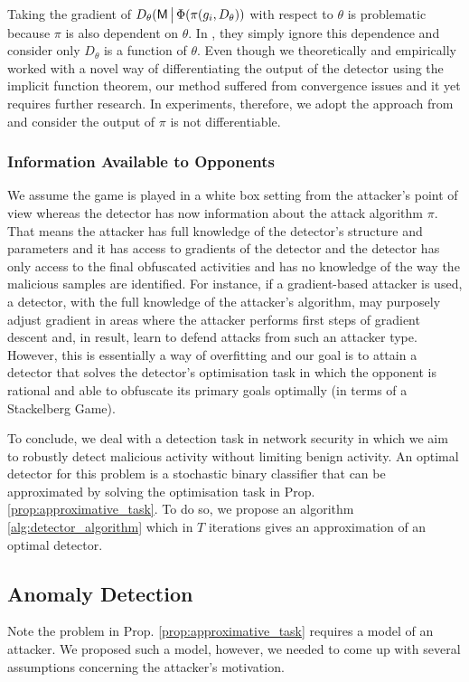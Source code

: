 Taking the gradient of $D_\theta(\mathsf{M} \,\big|\, \Phi( \pi (g_i, D_\theta) )$ with respect to $\theta$ is problematic because $\pi$ is also dependent on $\theta$. In \cite{exploitability_descent}, they simply ignore this dependence and consider only $D_\theta$ is a function of $\theta$.
Even though we theoretically and empirically worked with a novel way of differentiating the output of the detector using the implicit function theorem, our method suffered from convergence issues and it yet requires further research. In experiments, therefore, we adopt the approach from \cite{exploitability_descent} and consider the output of $\pi$ is not differentiable.

\subsubsection{Information Available to Opponents}
We assume the game is played in a white box setting from the attacker's point of view whereas the detector has now information about the attack algorithm $\pi$. That means the attacker has full knowledge of the detector's structure and parameters and it has access to gradients of the detector and the detector has only access to the final obfuscated activities and has no knowledge of the way the malicious samples are identified. For instance, if a gradient-based attacker is used, a detector, with the full knowledge of the attacker's algorithm, may purposely adjust gradient in areas where the attacker performs first steps of gradient descent and, in result, learn to defend attacks from such an attacker type. However, this is essentially a way of overfitting and our goal is to attain a detector that solves the detector's optimisation task in which the opponent is rational and able to obfuscate its primary goals optimally (in terms of a Stackelberg Game).

To conclude, we deal with a detection task in network security in which we aim to robustly detect malicious activity without limiting benign activity. An optimal detector for this problem is a stochastic binary classifier that can be approximated by solving the optimisation task in Prop. \ref{prop:approximative_task}. To do so, we propose an algorithm \ref{alg:detector_algorithm} which in $T$ iterations gives an approximation of an optimal detector.

\subsection{Anomaly Detection}\label{sec:anomaly_detection}
Note the problem in Prop. \ref{prop:approximative_task} requires a model of an attacker. We proposed such a model, however, we needed to come up with several assumptions concerning the attacker's motivation.

